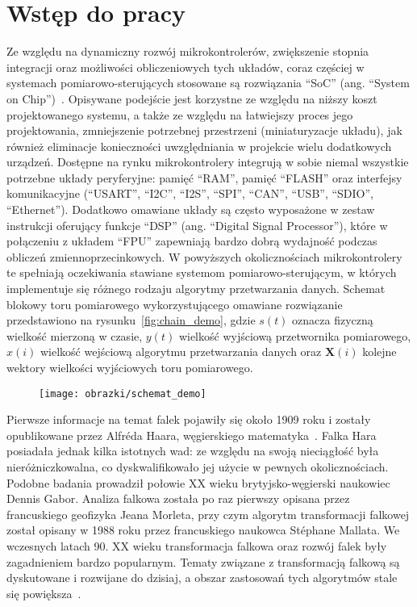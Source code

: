 \chapter{Wstęp do pracy}

Ze względu na dynamiczny rozwój mikrokontrolerów, zwiększenie stopnia integracji oraz możliwości obliczeniowych tych układów, coraz częściej w systemach pomiarowo-sterujących stosowane są rozwiązania \enquote{SoC} (ang. \enquote{System on Chip})~\cite{saleh_systemonchip}. Opisywane podejście jest korzystne ze względu na niższy koszt projektowanego systemu, a także ze względu na łatwiejszy proces jego projektowania, zmniejszenie potrzebnej przestrzeni (miniaturyzacje układu), jak również eliminacje konieczności uwzględniania w projekcie wielu dodatkowych urządzeń. Dostępne na rynku mikrokontrolery integrują w sobie niemal wszystkie potrzebne układy peryferyjne: pamięć \enquote{RAM}, pamięć \enquote{FLASH} oraz interfejsy komunikacyjne (\enquote{USART}, \enquote{I2C}, \enquote{I2S}, \enquote{SPI}, \enquote{CAN}, \enquote{USB}, \enquote{SDIO}, \enquote{Ethernet}). Dodatkowo omawiane układy są często wyposażone w zestaw instrukcji oferujący funkcje \enquote{DSP} (ang. \enquote{Digital Signal Processor}), które w połączeniu z układem \enquote{FPU} zapewniają bardzo dobrą wydajność podczas obliczeń zmiennoprzecinkowych. W powyższych okolicznościach mikrokontrolery te spełniają oczekiwania stawiane systemom pomiarowo-sterującym, w których implementuje się różnego rodzaju algorytmy przetwarzania danych. Schemat blokowy toru pomiarowego wykorzystującego omawiane rozwiązanie przedstawiono na rysunku~\ref{fig:chain_demo}, gdzie $s(t)$ oznacza fizyczną wielkość mierzoną w czasie, $y(t)$ wielkość wyjściową przetwornika pomiarowego, $x(i)$ wielkość wejściową algorytmu przetwarzania danych oraz $\mathbf{X}(i)$ kolejne wektory wielkości wyjściowych toru pomiarowego.

\begin{figure}[htb!]
\begin{center}
\texttt{[image: obrazki/schemat\_demo]}
\end{center}
\end{figure}

Pierwsze informacje na temat falek pojawiły się około 1909 roku i zostały opublikowane przez Alfréda Haara, węgierskiego matematyka~\cite{haar_basics}. Falka Hara posiadała jednak kilka istotnych wad: ze względu na swoją nieciągłość była nieróżniczkowalna, co dyskwalifikowało jej użycie w pewnych okolicznościach. Podobne badania prowadził połowie XX wieku brytyjsko-węgierski naukowiec Dennis Gabor. Analiza falkowa została po raz pierwszy opisana przez francuskiego geofizyka Jeana Morleta, przy czym algorytm transformacji falkowej został opisany w 1988 roku przez francuskiego naukowca Stéphane Mallata. We wczesnych latach 90. XX wieku transformacja falkowa oraz rozwój falek były zagadnieniem bardzo popularnym. Tematy związane z transformacją falkową są dyskutowane i rozwijane do dzisiaj, a obszar zastosowań tych algorytmów stale się powiększa~\cite{akujuobi_applications}.

